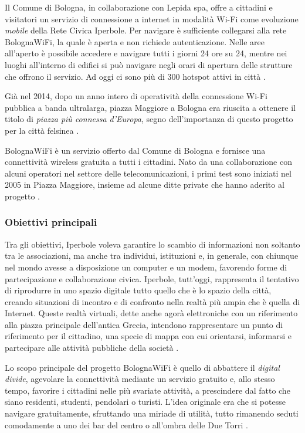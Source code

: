 Il Comune di Bologna, in collaborazione con Lepida spa, offre a cittadini e visitatori un servizio di connessione a internet in modalità Wi-Fi come evoluzione \textit{mobile} della Rete Civica Iperbole. Per navigare è sufficiente collegarsi alla rete BolognaWiFi, la quale è aperta e non richiede autenticazione. Nelle aree all'aperto è possibile accedere e navigare tutti i giorni 24 ore su 24, mentre nei luoghi all'interno di edifici si può navigare negli orari di apertura delle strutture che offrono il servizio. Ad oggi ci sono più di 300 hotspot attivi in città \cite{BolognaWiFi_Elenco_Hotspot}.


Già nel 2014, dopo un anno intero di operatività della connessione Wi-Fi pubblica a banda ultralarga, piazza Maggiore a Bologna era riuscita a ottenere il titolo di \textit{piazza più connessa d'Europa}, segno dell'importanza di questo progetto per la città felsinea \cite{Smart_City_Piazza_Connessa_Europa}.

BolognaWiFi è un servizio offerto dal Comune di Bologna e fornisce una connettività wireless gratuita a tutti i cittadini. Nato da una collaborazione con alcuni operatori nel settore delle telecomunicazioni, i primi test sono iniziati nel 2005 in Piazza Maggiore, insieme ad alcune ditte private che hanno aderito al progetto \cite{Bologna_WiFi_Bluetooth}.

\subsubsection{Obiettivi principali}
Tra gli obiettivi, Iperbole voleva garantire lo scambio di informazioni non soltanto tra le associazioni, ma anche tra individui, istituzioni e, in generale, con chiunque nel mondo avesse a disposizione un computer e un modem, favorendo forme di partecipazione e collaborazione civica.
Iperbole, tutt'oggi, rappresenta il tentativo di riprodurre in uno spazio digitale tutto quello che è lo spazio della città, creando situazioni di incontro e di confronto nella realtà più ampia che è quella di Internet. Queste realtà virtuali, dette anche agorà elettroniche con un riferimento alla piazza principale dell'antica Grecia, intendono rappresentare un punto di riferimento per il cittadino, una specie di mappa con cui orientarsi, informarsi e partecipare alle attività pubbliche della società \cite{Iperbole_Citta_Connessa}.


Lo scopo principale del progetto BolognaWiFi è quello di abbattere il \textit{digital divide}, agevolare la connettività mediante un servizio gratuito e, allo stesso tempo, favorire i cittadini nelle più svariate attività, a prescindere dal fatto che siano residenti, studenti, pendolari o turisti. L'idea originale era che si potesse navigare gratuitamente, sfruttando una miriade di utilità, tutto rimanendo seduti comodamente a uno dei bar del centro o all'ombra delle Due Torri \cite{Bologna_WiFi_Bluetooth}.


